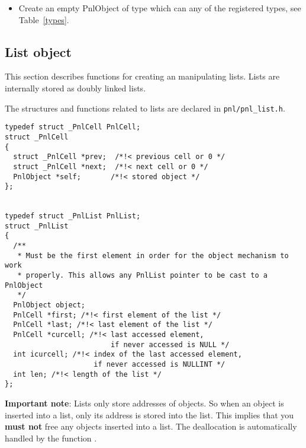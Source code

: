 \begin{itemize}
\item {}
  \sshortdescribe Create an empty PnlObject of type  which can any of
  the registered types, see Table~\ref{types}.
\end{itemize}

\subsection{List object}

This section describes functions for creating an manipulating lists. Lists are
internally stored as doubly linked lists.

The structures and functions related to lists are declared in
\verb!pnl/pnl_list.h!.

\begin{verbatim}
typedef struct _PnlCell PnlCell;
struct _PnlCell
{
  struct _PnlCell *prev;  /*!< previous cell or 0 */
  struct _PnlCell *next;  /*!< next cell or 0 */
  PnlObject *self;       /*!< stored object */
};


typedef struct _PnlList PnlList;
struct _PnlList
{
  /**
   * Must be the first element in order for the object mechanism to work
   * properly. This allows any PnlList pointer to be cast to a PnlObject
   */
  PnlObject object; 
  PnlCell *first; /*!< first element of the list */
  PnlCell *last; /*!< last element of the list */
  PnlCell *curcell; /*!< last accessed element,
                         if never accessed is NULL */
  int icurcell; /*!< index of the last accessed element,
                     if never accessed is NULLINT */
  int len; /*!< length of the list */
};
\end{verbatim}

\textbf{Important note}: Lists only store addresses of objects. So when an
object is inserted into a list, only its address is stored into the list. This
implies that you \textbf{must not} free any objects inserted into a list. The
deallocation is automatically handled by the function .

